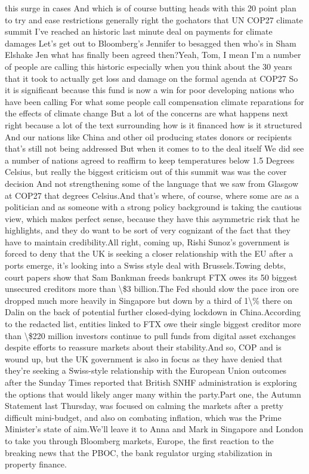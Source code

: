 \documentclass{article}%
\begin{document}
this surge in cases And which is of course butting heads with this 20 point plan to try and ease restrictions generally right the gochators that UN COP27 climate summit I've reached an historic last minute deal on payments for climate damages Let's get out to Bloomberg's Jennifer to besagged then who's in Sham Elshake Jen what has finally been agreed then?Yeah, Tom, I mean I'm a number of people are calling this historic especially when you think about the 30 years that it took to actually get loss and damage on the formal agenda at COP27 So it is significant because this fund is now a win for poor developing nations who have been calling For what some people call compensation climate reparations for the effects of climate change But a lot of the concerns are what happens next right because a lot of the text surrounding how is it financed how is it structured And our nations like China and other oil producing states donors or recipients that's still not being addressed But when it comes to to the deal itself We did see a number of nations agreed to reaffirm to keep temperatures below 1.5 Degrees Celsius, but really the biggest criticism out of this summit was was the cover decision And not strengthening some of the language that we saw from Glasgow at COP27  that degrees Celsius.And that's where, of course, where some are as a politician and as someone with a strong policy background is taking the cautious view, which makes perfect sense, because they have this asymmetric risk that he highlights, and they do want to be sort of very cognizant of the fact that they have to maintain credibility.All right, coming up, Rishi Sunoz's government is forced to deny that the UK is seeking a closer relationship with the EU after a ports emerge, it's looking into a Swiss style deal with Brussels.Towing debts, court papers show that Sam Bankman freeds bankrupt FTX owes its 50 biggest unsecured creditors more than \textbackslash{}\$3 billion.The Fed should slow the pace iron ore dropped much more heavily in Singapore but down by a third of 1\textbackslash{}\% there on Dalin on the back of potential further closed{-}dying lockdown in China.According to the redacted list, entities linked to FTX owe their single biggest creditor more than \textbackslash{}\$220 million investors continue to pull funds from digital asset exchanges despite efforts to reassure markets about their stability.And so, COP and is wound up, but the UK government is also in focus as they have denied that they're seeking a Swiss{-}style relationship with the European Union outcomes after the Sunday Times reported that British SNHF administration is exploring the options that would likely anger many within the party.Part one, the Autumn Statement last Thursday, was focused on calming the markets after a pretty difficult mini{-}budget, and also on combating inflation, which was the Prime Minister's state of aim.We'll leave it to Anna and Mark in Singapore and London to take you through Bloomberg markets, Europe, the first reaction to the breaking news that the PBOC, the bank regulator urging stabilization in property finance.%
\end{document}
